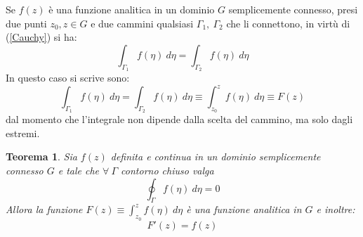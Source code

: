 \documentclass[twoside]{article}
\newtheorem{theorem}{Teorema}[section]
\begin{document}
Se $f(z)$ è una funzione analitica in un dominio $G$ semplicemente connesso, presi due punti $z_0,z \in G$ e due cammini qualsiasi $\Gamma_1, \ \Gamma_2$ che li connettono, in virtù di (\ref{Cauchy}) si ha:
\begin{equation}
    \int_{\Gamma_1}f(\eta) \ d\eta=\int_{\Gamma_2}f(\eta) \ d\eta
\end{equation}
In questo caso si scrive sono:
\begin{equation}
   \int_{\Gamma_1}f(\eta) \ d\eta=\int_{\Gamma_2}f(\eta) \ d\eta\equiv\int_{z_0}^{z}f(\eta) \ d\eta\equiv F(z) 
\end{equation}
dal momento che l'integrale non dipende dalla scelta del cammino, ma solo dagli estremi.
\\
\begin{theorem} \label{F(z)}
Sia $f(z)$ definita e continua in un dominio semplicemente connesso $G$ e tale che $\forall \ \Gamma$ contorno chiuso valga
\begin{equation}
    \oint_{\Gamma}f(\eta) \ d\eta=0
\end{equation}
Allora la funzione $F(z)\equiv \int_{z_0}^{z} f(\eta) \ d\eta$ è una funzione analitica in $G$ e inoltre:
\begin{equation}
    F'(z)=f(z)
\end{equation}
\end{theorem}
\end{document}
